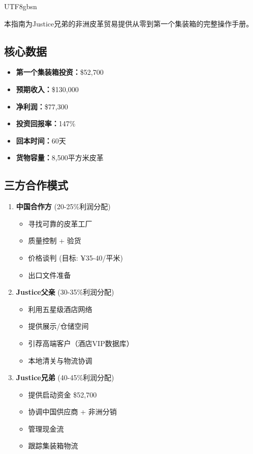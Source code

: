 \documentclass[12pt,a4paper]{article}
\begin{document}
\begin{CJK}{UTF8}{gbsn}

本指南为Justice兄弟的非洲皮革贸易提供从零到第一个集装箱的完整操作手册。

\subsection*{核心数据}

\begin{itemize}[leftmargin=2cm]
    \item \textbf{第一个集装箱投资：}\$52,700
    \item \textbf{预期收入：}\$130,000
    \item \textbf{净利润：}\$77,300
    \item \textbf{投资回报率：}147\%
    \item \textbf{回本时间：}60天
    \item \textbf{货物容量：}8,500平方米皮革
\end{itemize}

\subsection*{三方合作模式}

\begin{enumerate}
    \item \textbf{中国合作方} (20-25\%利润分配)
    \begin{itemize}
        \item 寻找可靠的皮革工厂
        \item 质量控制 + 验货
        \item 价格谈判 (目标: ¥35-40/平米)
        \item 出口文件准备
    \end{itemize}
    
    \item \textbf{Justice父亲} (30-35\%利润分配)
    \begin{itemize}
        \item 利用五星级酒店网络
        \item 提供展示/仓储空间
        \item 引荐高端客户（酒店VIP数据库）
        \item 本地清关与物流协调
    \end{itemize}
    
    \item \textbf{Justice兄弟} (40-45\%利润分配)
    \begin{itemize}
        \item 提供启动资金 \$52,700
        \item 协调中国供应商 + 非洲分销
        \item 管理现金流
        \item 跟踪集装箱物流
    \end{itemize}
\end{enumerate}

\end{CJK}
\end{document}
